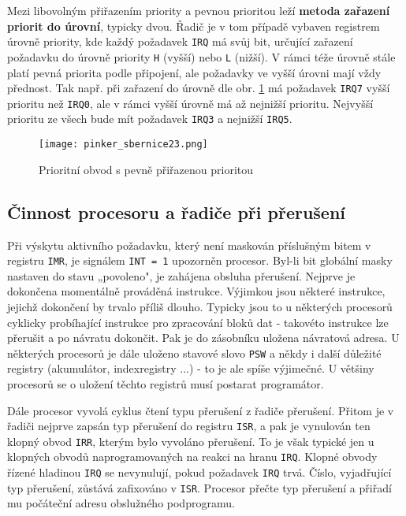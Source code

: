       Mezi libovolným přiřazením priority a pevnou prioritou leží \textbf{metoda zařazení priorit 
      do úrovní}, typicky dvou. Řadič je v tom případě vybaven registrem úrovně priority, kde každý 
      požadavek \texttt{IRQ} má svůj bit, určující zařazení požadavku do úrovně priority \texttt{H} 
      (vyšší) nebo \texttt{L} (nižší). V rámci téže úrovně stále platí pevná priorita podle 
      připojení, ale požadavky ve vyšší úrovni mají vždy přednost. Tak např. při zařazení do úrovně 
      dle obr. \ref{MIT:fig_sbernice23} má požadavek \texttt{IRQ7} vyšší prioritu než 
      \texttt{IRQ0}, ale v rámci vyšší úrovně má až nejnižší prioritu. Nejvyšší prioritu ze všech 
      bude mít požadavek \texttt{IRQ3} a nejnižší \texttt{IRQ5}.
      
      \begin{figure}[ht!] %
        \centering
        \texttt{[image: pinker\_sbernice23.png]}
        \caption{Prioritní obvod s pevně přiřazenou prioritou}
        \label{MIT:fig_sbernice23}
      \end{figure}
      
    \subsection{Činnost procesoru a řadiče při přerušení}
      Při výskytu aktivního požadavku, který není maskován příslušným bitem v registru 
      \texttt{IMR}, je signálem \texttt{INT = 1} upozorněn procesor. Byl-li bit globální masky 
      nastaven do stavu „povoleno", je zahájena obsluha přerušení. Nejprve je dokončena momentálně 
      prováděná instrukce. Výjimkou jsou některé instrukce, jejichž dokončení by trvalo příliš 
      dlouho. Typicky jsou to u některých procesorů cyklicky probíhající instrukce pro zpracování 
      bloků dat - takovéto instrukce lze přerušit a po návratu dokončit. Pak je do zásobníku 
      uložena návratová adresa. U některých procesorů je dále uloženo stavové slovo \texttt{PSW} a 
      někdy i další důležité registry (akumulátor, indexregistry ...) - to je ale spíše 
      výjimečné. U většiny procesorů se o uložení těchto registrů musí postarat programátor.
      
      Dále procesor vyvolá cyklus čtení typu přerušení z řadiče přerušení. Přitom je v řadiči 
      nejprve zapsán typ přerušení do registru \texttt{ISR}, a pak je vynulován ten klopný obvod 
      \texttt{IRR}, kterým bylo vyvoláno přerušení. To je však typické jen u klopných obvodů 
      naprogramovaných na reakci na hranu \texttt{IRQ}. Klopné obvody řízené hladinou \texttt{IRQ} 
      se nevynulují, pokud požadavek \texttt{IRQ} trvá. Číslo, vyjadřující typ přerušení, zůstává 
      zafixováno v \texttt{ISR}. Procesor přečte typ přerušení a přiřadí mu počáteční adresu 
      obslužného podprogramu.
      
